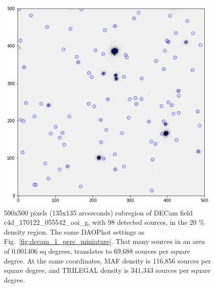\documentclass[DM,lsstdraft,toc,usenatbib]{lsstdoc}
\begin{document}

\begin{figure}
\begin{minipage}[t]{0.5\linewidth}
\includegraphics[width=\linewidth]{figs/c4d_170122_055542_ooi_g_v1_1_sub_500px.png}
\caption{500x500 pixels (135x135 arcseconds) subregion of DECam field c4d\_170122\_055542\_ooi\_g,  with 98  detected sources, in the  20 \% density region. The same DAOPhot settings as Fig.~\ref{fig:decam_1_perc_miniature}. That many sources in an area of 0.001406 sq degrees,  translates to 69,688 sources per square degree. At the same coordinates,  MAF density is  116,856 sources per square degree, and TRILEGAL density is 341,343 sources per square degree. }
\label{fig:decam_20_perc_miniature}
\end{minipage}
\hfill
\begin{minipage}[t]{0.5\linewidth}

\end{minipage}
\end{figure}
\end{document}
